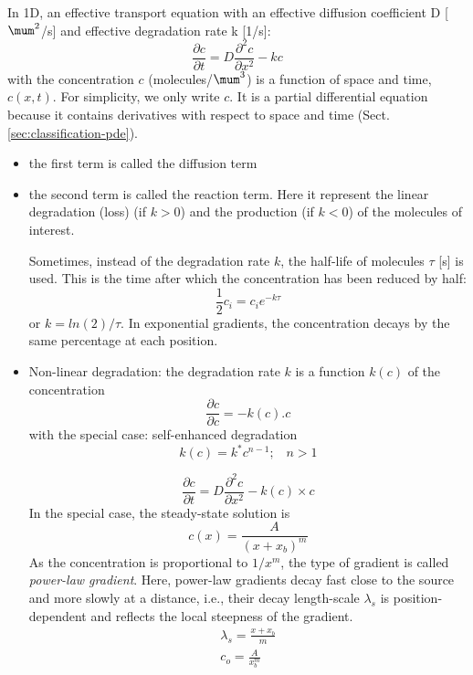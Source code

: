 In 1D, an effective transport equation with an effective diffusion coefficient D
[$\mum^2$/s] and effective degradation rate k [1/s]:
\begin{equation}
\label{eq:reaction-diffusion-simple}
\frac{\partial c}{\partial t} = D \frac{\partial^2 c}{\partial x^2} - kc
\end{equation}
with the concentration $c$ (molecules/$\mum^3$) is a function of space and time, 
$c(x,t)$. For simplicity, we only write $c$. It is a partial differential
equation because it contains derivatives with respect to space and time
(Sect.\ref{sec:classification-pde}).
\begin{itemize}
  \item the first term is called the diffusion term
  \item the second term is called the reaction term. Here it represent the
  linear degradation (loss) (if $k>0$) and the production (if $k<0$) of the
  molecules of interest.

Sometimes, instead of the degradation rate $k$, the half-life of molecules
$\tau$ [s] is used. This is the time after which the concentration has been
reduced by half:
\begin{equation}
\frac{1}{2}c_i = c_i e^{-k\tau}
\end{equation}
or $k = ln(2)/\tau$.
In exponential gradients, the concentration decays by the same
 percentage at each position. 


   \item Non-linear degradation: the degradation rate $k$ is a function $k(c)$
   of the concentration 
\begin{equation}
\frac{\partial c}{\partial c} = -k(c).c
\end{equation}
with the special case: self-enhanced degradation
\begin{equation}
k(c) = k^* c^{n-1}; \;\;\; n>1
\end{equation}

\begin{equation}
\label{eq:reaction-diffusion-nonlinear}
\frac{\partial c}{\partial t} = D \frac{\partial^2 c}{\partial x^2} - k(c)
\times c
\end{equation}
 In the special case, the steady-state solution is 
 \begin{equation}
 c(x) = \frac{A}{(x+x_b)^m}
 \end{equation}
 As the concentration is proportional to $1/x^m$,
 the type of gradient is called {\it power-law gradient}.
Here, power-law gradients decay fast close to the source and more slowly at a
distance, i.e., their decay length-scale $\lambda_s$ is position-dependent and
reflects the local steepness of the gradient.
\begin{equation}
\begin{split}
\lambda_s = \frac{x+x_b}{m} \\
c_o = \frac{A}{x_b^m}
\end{split}
\end{equation}


\end{itemize}
